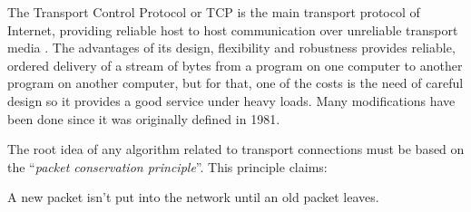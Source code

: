 
The Transport Control Protocol or TCP is the main transport protocol of 
Internet, providing reliable host to host communication over unreliable
transport media \cite{rfc793}. The advantages of its design,
flexibility and robustness provides reliable, ordered delivery of a stream of
bytes from a program on one computer to another program on another computer,
but for that, one of the costs is the need of careful design so it provides a good
service under heavy loads. Many modifications have been done since it was
originally defined in 1981.

The root idea of any algorithm related to transport connections must be based
on the ``\textit{packet conservation principle}''. This principle claims:

\begin{defn}
A new packet isn't put into the network until an old packet leaves.
\end{defn}
